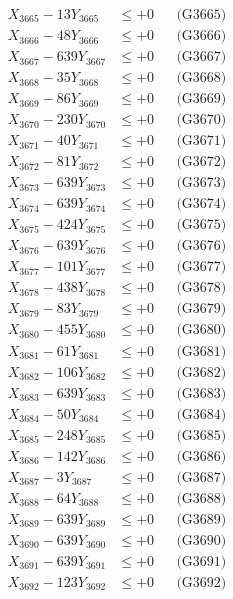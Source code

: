 \documentclass[a4paper,10pt]{article}
\begin{document}
{\begin{align}
X_{3665} - 13Y_{3665} &\leq +0 && \text{(G3665)} \\
X_{3666} - 48Y_{3666} &\leq +0 && \text{(G3666)} \\
X_{3667} - 639Y_{3667} &\leq +0 && \text{(G3667)} \\
X_{3668} - 35Y_{3668} &\leq +0 && \text{(G3668)} \\
X_{3669} - 86Y_{3669} &\leq +0 && \text{(G3669)} \\
X_{3670} - 230Y_{3670} &\leq +0 && \text{(G3670)} \\
\allowbreak
X_{3671} - 40Y_{3671} &\leq +0 && \text{(G3671)} \\
X_{3672} - 81Y_{3672} &\leq +0 && \text{(G3672)} \\
X_{3673} - 639Y_{3673} &\leq +0 && \text{(G3673)} \\
X_{3674} - 639Y_{3674} &\leq +0 && \text{(G3674)} \\
X_{3675} - 424Y_{3675} &\leq +0 && \text{(G3675)} \\
X_{3676} - 639Y_{3676} &\leq +0 && \text{(G3676)} \\
X_{3677} - 101Y_{3677} &\leq +0 && \text{(G3677)} \\
X_{3678} - 438Y_{3678} &\leq +0 && \text{(G3678)} \\
X_{3679} - 83Y_{3679} &\leq +0 && \text{(G3679)} \\
X_{3680} - 455Y_{3680} &\leq +0 && \text{(G3680)} \\
\allowbreak
X_{3681} - 61Y_{3681} &\leq +0 && \text{(G3681)} \\
X_{3682} - 106Y_{3682} &\leq +0 && \text{(G3682)} \\
X_{3683} - 639Y_{3683} &\leq +0 && \text{(G3683)} \\
X_{3684} - 50Y_{3684} &\leq +0 && \text{(G3684)} \\
X_{3685} - 248Y_{3685} &\leq +0 && \text{(G3685)} \\
X_{3686} - 142Y_{3686} &\leq +0 && \text{(G3686)} \\
X_{3687} - 3Y_{3687} &\leq +0 && \text{(G3687)} \\
X_{3688} - 64Y_{3688} &\leq +0 && \text{(G3688)} \\
X_{3689} - 639Y_{3689} &\leq +0 && \text{(G3689)} \\
X_{3690} - 639Y_{3690} &\leq +0 && \text{(G3690)} \\
\allowbreak
X_{3691} - 639Y_{3691} &\leq +0 && \text{(G3691)} \\
X_{3692} - 123Y_{3692} &\leq +0 && \text{(G3692)} \\

\end{align}}
\end{document}
